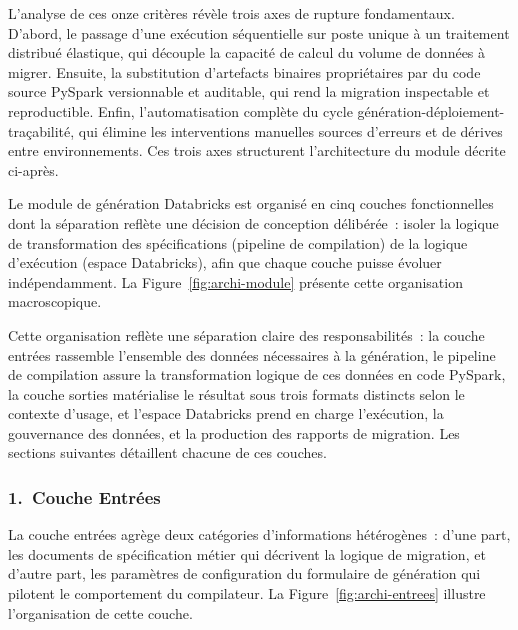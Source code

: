 L'analyse de ces onze critères révèle trois axes de rupture fondamentaux. D'abord, le passage d'une exécution séquentielle sur poste unique à un traitement distribué élastique, qui découple la capacité de calcul du volume de données à migrer. Ensuite, la substitution d'artefacts binaires propriétaires par du code source PySpark versionnable et auditable, qui rend la migration inspectable et reproductible. Enfin, l'automatisation complète du cycle génération-déploiement-traçabilité, qui élimine les interventions manuelles sources d'erreurs et de dérives entre environnements. Ces trois axes structurent l'architecture du module décrite ci-après.

Le module de génération Databricks est organisé en cinq couches fonctionnelles dont la séparation reflète une décision de conception délibérée~: isoler la logique de transformation des spécifications (pipeline de compilation) de la logique d'exécution (espace Databricks), afin que chaque couche puisse évoluer indépendamment. La Figure~\ref{fig:archi-module} présente cette organisation macroscopique.



Cette organisation reflète une séparation claire des responsabilités~: la couche entrées rassemble l'ensemble des données nécessaires à la génération, le pipeline de compilation assure la transformation logique de ces données en code PySpark, la couche sorties matérialise le résultat sous trois formats distincts selon le contexte d'usage, et l'espace Databricks prend en charge l'exécution, la gouvernance des données, et la production des rapports de migration. Les sections suivantes détaillent chacune de ces couches.

\subsubsection*{1.\ Couche Entrées}

La couche entrées agrège deux catégories d'informations hétérogènes~: d'une part, les documents de spécification métier qui décrivent la logique de migration, et d'autre part, les paramètres de configuration du formulaire de génération qui pilotent le comportement du compilateur. La Figure~\ref{fig:archi-entrees} illustre l'organisation de cette couche.



